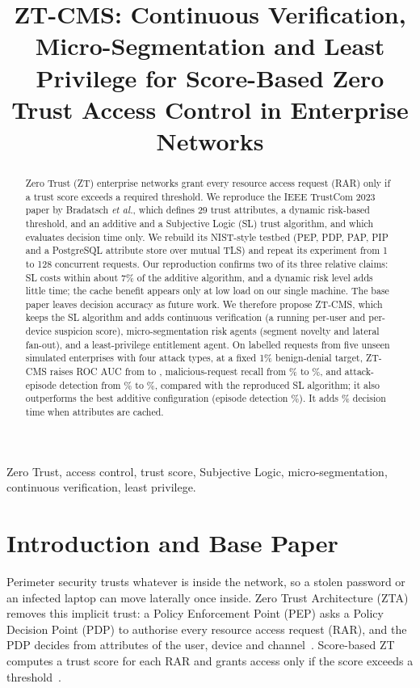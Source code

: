\documentclass[conference,a4paper]{IEEEtran}
\title{ZT-CMS: Continuous Verification, Micro-Segmentation and Least Privilege for Score-Based Zero Trust Access Control in Enterprise Networks}
\author{\IEEEauthorblockN{Parveen Kumar (23BCS093), Mann (23BCS078),
Vishavjeet (23BDS069), and Shreevats (23BDS055)}
\IEEEauthorblockA{Indian Institute of Information Technology Dharwad, India}}
\begin{document}
\maketitle
\begin{abstract}
Zero Trust (ZT) enterprise networks grant every resource access request (RAR) only if a trust score exceeds a required threshold. We reproduce the IEEE TrustCom 2023 paper by Bradatsch \emph{et al.}, which defines 29 trust attributes, a dynamic risk-based threshold, and an additive and a Subjective Logic (SL) trust algorithm, and which evaluates decision time only. We rebuild its NIST-style testbed (PEP, PDP, PAP, PIP and a PostgreSQL attribute store over mutual TLS) and repeat its experiment from 1 to 128 concurrent requests. Our reproduction confirms two of its three relative claims: SL costs within about 7\% of the additive algorithm, and a dynamic risk level adds little time; the cache benefit appears only at low load on our single machine. The base paper leaves decision accuracy as future work. We therefore propose ZT-CMS, which keeps the SL algorithm and adds continuous verification (a running per-user and per-device suspicion score), micro-segmentation risk agents (segment novelty and lateral fan-out), and a least-privilege entitlement agent. On \NTest{} labelled requests from five unseen simulated enterprises with four attack types, at a fixed 1\% benign-denial target, ZT-CMS raises ROC AUC from \AucSLD{} to \AucZ{}, malicious-request recall from \RecSLD\% to \RecZ\%, and attack-episode detection from \EpSLD\% to \EpZ\%, compared with the reproduced SL algorithm; it also outperforms the best additive configuration (episode detection \EpAddD\%). It adds \ZvsSLDC\% decision time when attributes are cached.
\end{abstract}
\begin{IEEEkeywords}
Zero Trust, access control, trust score, Subjective Logic, micro-segmentation, continuous verification, least privilege.
\end{IEEEkeywords}

\section{Introduction and Base Paper}
Perimeter security trusts whatever is inside the network, so a stolen password or an infected laptop can move laterally once inside. Zero Trust Architecture (ZTA) removes this implicit trust: a Policy Enforcement Point (PEP) asks a Policy Decision Point (PDP) to authorise every resource access request (RAR), and the PDP decides from attributes of the user, device and channel~\cite{nist}. Score-based ZT computes a trust score for each RAR and grants access only if the score exceeds a threshold~\cite{nist,gilman}.
\end{document}

